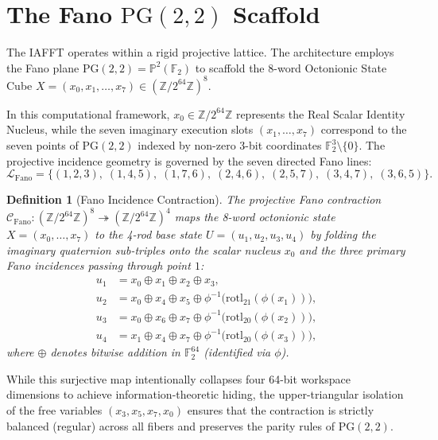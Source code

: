 \documentclass[11pt, a4paper]{article}
\newtheorem{definition}[theorem]{Definition}
\begin{document}
\section{The Fano \texorpdfstring{$\mathrm{PG}(2,2)$}{PG(2,2)} Scaffold}

The IAFFT operates within a rigid projective lattice. The architecture employs the Fano plane $\mathrm{PG}(2,2) = \mathbb{P}^2(\mathbb{F}_2)$ to scaffold the 8-word Octonionic State Cube $X = (x_0, x_1, \dots, x_7) \in (\mathbb{Z}/2^{64}\mathbb{Z})^8$.

In this computational framework, $x_0 \in \mathbb{Z}/2^{64}\mathbb{Z}$ represents the Real Scalar Identity Nucleus, while the seven imaginary execution slots $(x_1, \dots, x_7)$ correspond to the seven points of $\mathrm{PG}(2,2)$ indexed by non-zero 3-bit coordinates $\mathbb{F}_2^3 \setminus \{0\}$. The projective incidence geometry is governed by the seven directed Fano lines:
\[
\mathcal{L}_{\mathrm{Fano}} = \bigl\{(1,2,3),\; (1,4,5),\; (1,7,6),\; (2,4,6),\; (2,5,7),\; (3,4,7),\; (3,6,5)\bigr\}.
\]

\begin{definition}[Fano Incidence Contraction]
The projective Fano contraction $\mathcal{C}_{\mathrm{Fano}} : (\mathbb{Z}/2^{64}\mathbb{Z})^8 \twoheadrightarrow (\mathbb{Z}/2^{64}\mathbb{Z})^4$ maps the 8-word octonionic state $X = (x_0, \dots, x_7)$ to the 4-rod base state $U = (u_1, u_2, u_3, u_4)$ by folding the imaginary quaternion sub-triples onto the scalar nucleus $x_0$ and the three primary Fano incidences passing through point $1$:
\[
\begin{aligned}
u_1 &= x_0 \oplus x_1 \oplus x_2 \oplus x_3, \\
u_2 &= x_0 \oplus x_4 \oplus x_5 \oplus \phi^{-1}\bigl(\mathrm{rotl}_{21}(\phi(x_1))\bigr), \\
u_3 &= x_0 \oplus x_6 \oplus x_7 \oplus \phi^{-1}\bigl(\mathrm{rotl}_{20}(\phi(x_2))\bigr), \\
u_4 &= x_1 \oplus x_4 \oplus x_7 \oplus \phi^{-1}\bigl(\mathrm{rotl}_{20}(\phi(x_3))\bigr),
\end{aligned}
\]
where $\oplus$ denotes bitwise addition in $\mathbb{F}_2^{64}$ (identified via $\phi$).
\end{definition}

While this surjective map intentionally collapses four 64-bit workspace dimensions to achieve information-theoretic hiding, the upper-triangular isolation of the free variables $(x_3, x_5, x_7, x_0)$ ensures that the contraction is strictly balanced (regular) across all fibers and preserves the parity rules of $\mathrm{PG}(2,2)$.
\end{document}

